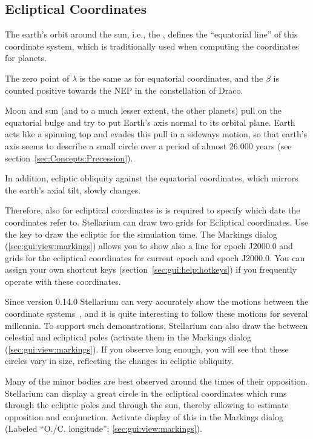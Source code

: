 \subsection{Ecliptical Coordinates}
\label{sec:Concepts:Ecliptical}

The earth's orbit around the sun, i.e., the ,
defines the ``equatorial line'' of this coordinate system, which is
traditionally used when computing the coordinates for planets.

The zero point of  $\lambda$ is the
same as for equatorial coordinates, and the  $\beta$ is counted positive towards the
 NEP in the constellation of
Draco.

Moon and sun (and to a much lesser extent, the other planets) pull on
the equatorial bulge and try to put Earth's axis normal to its orbital
plane. Earth acts like a spinning top and evades this pull in a
sideways motion, so that earth's axis seems to describe a small circle
over a period of almost 26.000 years (see
section~\ref{sec:Concepts:Precession}). 

In addition, ecliptic obliquity against the equatorial coordinates,
which mirrors the earth's axial tilt, slowly changes.

Therefore, also for ecliptical coordinates is is required to specify
which date the coordinates refer to.  Stellarium can draw two grids
for Ecliptical coordinates. Use the \key{,} key to draw the ecliptic
for the simulation time. The Markings dialog
(\ref{sec:gui:view:markings}) allows you to show also a line for epoch
J2000.0 and grids for the ecliptical coordinates for current epoch and
epoch J2000.0. You can assign your own shortcut keys
(section~\ref{sec:gui:help:hotkeys}) if you frequently operate with
these coordinates.

Since version 0.14.0 Stellarium can very accurately show the motions
between the coordinate systems~\cite{2011AA:Vondrak}, and it is quite
interesting to follow these motions for several millennia. To support
such demonstrations, Stellarium can also draw the
 between celestial and ecliptical poles
(activate them in the Markings dialog
(\ref{sec:gui:view:markings}). If you observe long enough, you will
see that these circles vary in size, reflecting the changes in
ecliptic obliquity.



Many of the minor bodies are best observed around the times of their
opposition.  Stellarium can display a great circle in the ecliptical
coordinates which runs through the ecliptic poles and through the sun,
thereby allowing to estimate opposition and conjunction. Activate
display of this  in the Markings dialog
(Labeled ``O./C. longitude''; \ref{sec:gui:view:markings}).


